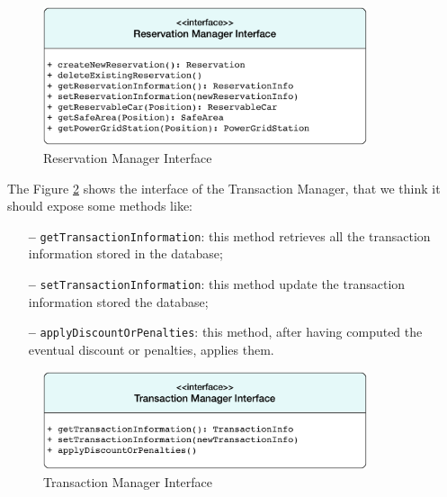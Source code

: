 \begin{figure}[htbp]
\centering
\vspace{36pt}
\includegraphics[width=0.85\textwidth]{Images/ReservationManager.pdf}
\vspace{10pt}
\caption{Reservation Manager Interface}
\label{fig:reservation}
\end{figure}
\clearpage

\newline
The Figure \ref{fig:transaction} shows the interface of the Transaction Manager, that we think it should expose some methods like:

\begin{itemize}
\item[\textbf{--}] \texttt{getTransactionInformation}: this method retrieves all the transaction information stored in the database;
\item[\textbf{--}] \texttt{setTransactionInformation}: this method update the transaction information stored the database;
\item[\textbf{--}] \texttt{applyDiscountOrPenalties}: this method, after having computed the eventual discount or penalties, applies them.
\end{itemize}

\begin{figure}[htbp]
\centering
\vspace{72pt}
\includegraphics[width=0.85\textwidth]{Images/TransactionManager.pdf}
\vspace{10pt}
\caption{Transaction Manager Interface}
\label{fig:transaction}
\end{figure}
\clearpage

